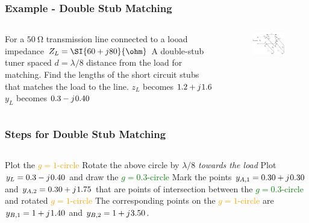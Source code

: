 \documentclass[10pt, compress]{beamer}
\renewcommand{\j}{{j}\mkern1mu} %
\begin{document}
\begin{frame}
    \frametitle{Example - Double Stub Matching}
    \begin{columns}[]
        \begin{column}[]{.5\textwidth}
            \begin{outline}
                \1 For a $\SI{50}{\ohm}$ transmission line connected to a looad impedance $Z_L = \SI{60 + j 80}{\ohm}$
                \1 A double-stub tuner spaced $d = \lambda/8$ distance from the load for matching.
                \1 Find the lengths of the short circuit stubs that matches the load to the line.
                \1 $z_L$ becomes $1.2 + \j 1.6$
                \1 $y_L$ becomes $0.3 - \j 0.40$
            \end{outline}  
        \end{column}
        \begin{column}[]{.5\textwidth}
            \begin{figure}[]
                \centering
                \includegraphics[width=.9\textwidth]{tline_double_stub.pdf}
            \end{figure}
        \end{column}
    \end{columns}
\end{frame}

\begin{frame}
    \frametitle{Steps for Double Stub Matching}
    \begin{columns}[]
        \begin{column}[]{1\textwidth}
            \begin{outline}[enumerate]
                \1 Plot the \textcolor{orange}{$g =1 $-circle} 
                \1 Rotate the above circle by $\lambda/8$ \textit{towards the load}
                \1 Plot $y_L = 0.3 - \j 0.40$ and draw the \textcolor{green}{$g=0.3$-circle}
                \1 Mark the points $y_{A,1} = 0.30 + \j 0.30$ and $y_{A,2} = 0.30 + \j 1.75$ that are points of intersection between the \textcolor{green}{$g=0.3$-circle} and rotated \textcolor{orange}{$g=1$-circle}
                \1 The corresponding points on the \textcolor{orange}{$g=1$-circle} are $y_{B,1} = 1 + \j 1.40$ and $y_{B,2} = 1 + \j 3.50$.
            \end{outline}  
        \end{column}
    \end{columns}
\end{frame}
\end{document}
